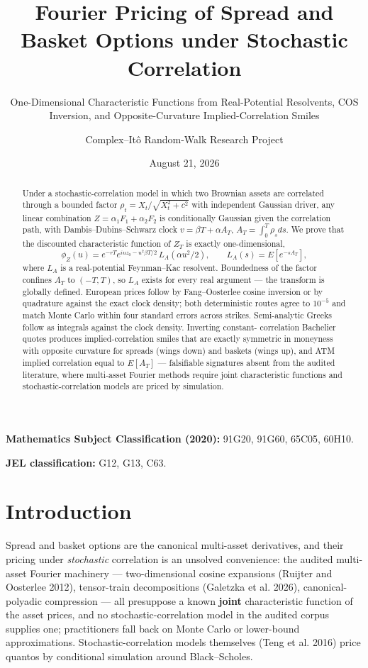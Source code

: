 \documentclass[
  english,
  10pt,
  letterpaper,
  DIV=11,
  numbers=noendperiod]{scrartcl}
\title{Fourier Pricing of Spread and Basket Options under Stochastic
Correlation}
\subtitle{One-Dimensional Characteristic Functions from Real-Potential
Resolvents, COS Inversion, and Opposite-Curvature Implied-Correlation
Smiles}
\author{Complex--Itô Random-Walk Research Project}
\date{August 21, 2026}
\renewcommand*\contentsname{Table of contents}
\newcommand\contentsname{Table of contents}
\begin{document}
\maketitle
\begin{abstract}
Under a stochastic-correlation model in which two Brownian assets are
correlated through a bounded factor \(\rho_t=X_t/\sqrt{X_t^2+c^2}\) with
independent Gaussian driver, any linear combination
\(Z=\alpha_1F_1+\alpha_2F_2\) is conditionally Gaussian given the
correlation path, with Dambis--Dubins--Schwarz clock
\(v=\beta T+\alpha A_T\), \(A_T=\int_0^T\rho_sds\). We prove that the
discounted characteristic function of \(Z_T\) is exactly
one-dimensional, \[\phi_Z(u)=e^{-rT}e^{iuz_0-u^2\beta T/2}\,
L_A(\alpha u^2/2),\qquad L_A(s)=E[e^{-sA_T}],\] where \(L_A\) is a
real-potential Feynman--Kac resolvent. Boundedness of the factor
confines \(A_T\) to \((-T,T)\), so \(L_A\) exists for every real
argument --- the transform is globally defined. European prices follow
by Fang--Oosterlee cosine inversion or by quadrature against the exact
clock density; both deterministic routes agree to \(10^{-5}\) and match
Monte Carlo within four standard errors across strikes. Semi-analytic
Greeks follow as integrals against the clock density. Inverting
constant- correlation Bachelier quotes produces implied-correlation
smiles that are exactly symmetric in moneyness with opposite curvature
for spreads (wings down) and baskets (wings up), and ATM implied
correlation equal to \(E[A_T]\) --- falsifiable signatures absent from
the audited literature, where multi-asset Fourier methods require joint
characteristic functions and stochastic-correlation models are priced by
simulation.
\end{abstract}

\renewcommand*\contentsname{Table of contents}
{
\setcounter{tocdepth}{2}
\tableofcontents
}

\textbf{Mathematics Subject Classification (2020):} 91G20, 91G60, 65C05,
60H10.

\textbf{JEL classification:} G12, G13, C63.

\section{Introduction}\label{sec-introduction}

Spread and basket options are the canonical multi-asset derivatives, and
their pricing under \emph{stochastic} correlation is an unsolved
convenience: the audited multi-asset Fourier machinery ---
two-dimensional cosine expansions (Ruijter and Oosterlee 2012),
tensor-train decompositions ({Galetzka et al.} 2026), canonical-polyadic
compression --- all presuppose a known \textbf{joint} characteristic
function of the asset prices, and no stochastic-correlation model in the
audited corpus supplies one; practitioners fall back on Monte Carlo or
lower-bound approximations. Stochastic-correlation models themselves
(Teng et al. 2016) price quantos by conditional simulation around
Black--Scholes.
\end{document}
